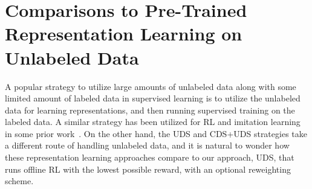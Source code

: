 \begin{table}[t!]
\centering
{}
\caption{\footnotesize On the multi-task Meta-World domain, we compare CDS+UDS and UDS to the model-based offline RL method COMBO~\citep{yu2021combo} that trains a dynamics model on all of the data and performs model-based offline training using the learned model. CDS+UDS and UDS are able to outperform COMBO by a large margin.}
\label{tbl:combo}
\normalsize
\end{table}

\section{Comparisons to Pre-Trained Representation Learning on Unlabeled Data}
\label{app:pretrained_reps}
A popular strategy to utilize large amounts of unlabeled data along with some limited amount of labeled data in supervised learning is to utilize the unlabeled data for learning representations, and then running supervised training on the labeled data. A similar strategy has been utilized for RL and imitation learning in some prior work~\citep{yang2021representation,yang2021trail}. On the other hand, the UDS and CDS+UDS strategies take a different route of handling unlabeled data, and it is natural to wonder how these representation learning approaches compare to our approach, UDS, that runs offline RL with the lowest possible reward, with an optional reweighting scheme.

